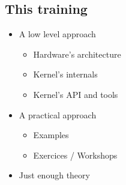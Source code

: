 \subsection*{This training}
\begin{frame}
  \begin{itemize}
  \item A low level approach
    \begin{itemize}
    \item Hardware's architecture
    \item Kernel's internals
    \item Kernel's API and tools
    \end{itemize}
  \item A practical approach
    \begin{itemize}
    \item Examples
    \item Exercices / Workshops
    \end{itemize}
  \item Just enough theory
  \end{itemize}
\end{frame}

